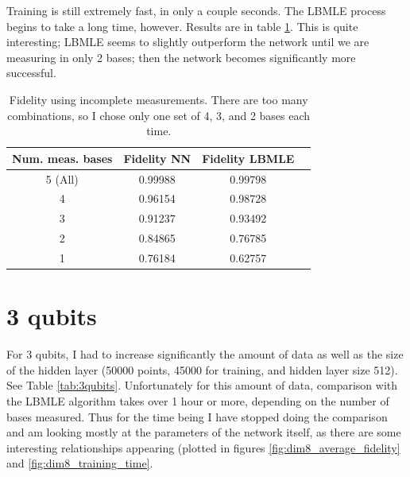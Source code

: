 \documentclass[a4paper,10pt]{article}
\begin{document}
Training is still extremely fast, in only a couple seconds. The LBMLE process begins to take a long time, however. Results are in table \ref{tab:2qubits}. This is quite interesting; LBMLE seems to slightly outperform the network until we are measuring in only 2 bases; then the network becomes significantly more successful.

\begin{table}[h!]
 \centering
 \begin{tabular}{|c||c|c|c|}
 \hline
  Num. meas. bases &  Fidelity NN & Fidelity LBMLE \\ \hline
  5 (All) & 0.99988 &  0.99798 \\
  4 & 0.96154 & 0.98728 \\
  3 & 0.91237 &  0.93492 \\
  2 &  0.84865 & 0.76785 \\ 
  1 & 0.76184 & 0.62757 \\ \hline
 \end{tabular}
 \caption{Fidelity using incomplete measurements. There are too many combinations, so I chose only one set of 4, 3, and 2 bases each time.}
 \label{tab:2qubits}
\end{table}

\section{3 qubits}

For 3 qubits, I had to increase significantly the amount of data as well as the size of the hidden layer (50000 points, 45000 for training, and hidden layer size 512). See Table \ref{tab:3qubits}. Unfortunately for this amount of data, comparison with the LBMLE algorithm takes over 1 hour or more, depending on the number of bases measured. Thus for the time being I have stopped doing the comparison and am looking mostly at the parameters of the network itself, as there are some interesting relationships appearing (plotted in figures \ref{fig:dim8_average_fidelity} and \ref{fig:dim8_training_time}.
\end{document}
